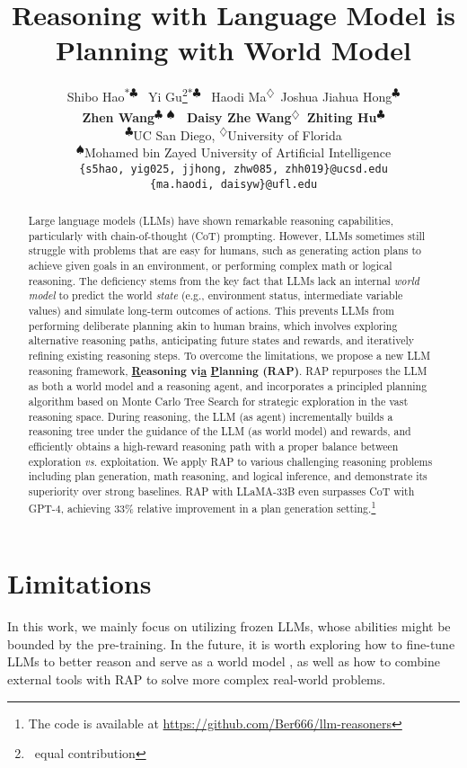 \documentclass[11pt]{article}
\title{Reasoning with Language Model is
Planning with World Model}
\author{%
Shibo Hao\textsuperscript{$*\clubsuit$} \ Yi Gu\thanks{\, equal contribution}\textsuperscript{$*\clubsuit$} \
Haodi Ma\textsuperscript{$\diamondsuit$}\  Joshua Jiahua Hong\textsuperscript{$\clubsuit$} \\ \textbf{Zhen Wang\textsuperscript{$\clubsuit$ $\spadesuit$} \
Daisy Zhe Wang\textsuperscript{$\diamondsuit$}\ Zhiting Hu\textsuperscript{$\clubsuit$}}  \vspace{5pt} \\
\textsuperscript{$\clubsuit$}UC San Diego, \textsuperscript{$\diamondsuit$}University of Florida\\
\textsuperscript{$\spadesuit$}Mohamed bin Zayed University of Artificial Intelligence \\
\texttt{\{s5hao, yig025, jjhong, zhw085, zhh019\}@ucsd.edu}  \\
\texttt{\{ma.haodi, daisyw\}@ufl.edu}}
\begin{document}
\maketitle
\begin{abstract}
Large language models (LLMs) have shown remarkable reasoning capabilities, particularly with chain-of-thought (CoT) prompting. However, LLMs sometimes still struggle with problems that are easy for humans, such as generating action plans to achieve given goals in an environment, or performing complex math or logical reasoning. The deficiency stems from the key fact that LLMs lack an internal \emph{world model} to predict the world \emph{state} (e.g., environment status, intermediate variable values) and simulate long-term outcomes of actions. This prevents LLMs from performing deliberate planning akin to human brains, which involves exploring alternative reasoning paths, anticipating future states and rewards, and iteratively refining existing reasoning steps. To overcome the limitations, we propose a new LLM reasoning framework, {\bf \underline{R}easoning vi\underline{a} \underline{P}lanning (RAP)}. RAP repurposes the LLM as both a world model and a reasoning agent, and incorporates a principled planning algorithm based on Monte Carlo Tree Search for strategic exploration in the vast reasoning space. During reasoning, the LLM (as agent) incrementally builds a reasoning tree under the guidance of the LLM (as world model) and rewards, and efficiently obtains a high-reward reasoning path with a proper balance between exploration \emph{vs.} exploitation. 
We apply RAP to various challenging reasoning problems including plan generation, math reasoning, and logical inference, and demonstrate its superiority over strong baselines. RAP with LLaMA-33B even surpasses CoT with GPT-4, achieving 33\% relative improvement in a plan generation setting.\footnote{The code is available at \url{https://github.com/Ber666/llm-reasoners}}
\end{abstract}





\section*{Limitations}
In this work, we mainly focus on utilizing frozen LLMs, whose abilities might be bounded by the pre-training. In the future, it is worth exploring how to fine-tune LLMs to better reason and serve as a world model \cite{xiang2023language}, as well as how to combine external tools \cite{hao2023toolkengpt,schick2023toolformer} with RAP to solve more complex real-world problems.
\end{document}
